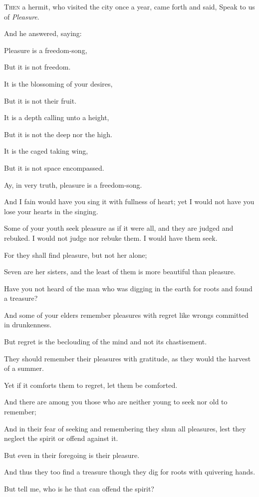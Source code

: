 
\lettrine{T}{hen} a hermit, who visited the city
once a year, came forth and said, Speak
to us of \textit{Pleasure}.

And he answered, saying:

Pleasure is a freedom-song,

But it is not freedom.

It is the blossoming of your desires,

But it is not their fruit.

It is a depth calling unto a height,

But it is not the deep nor the high.

It is the caged taking wing,

But it is not space encompassed.

Ay, in very truth, pleasure is a
freedom-song.

And I fain would have you sing it with
fullness of heart; yet I would not have
you lose your hearts in the singing.

Some of your youth seek pleasure as if
it were all, and they are judged and
rebuked. I would not judge nor
rebuke them. I would have them seek.

For they shall find pleasure, but not
her alone;

Seven are her sisters, and the least of
them is more beautiful than pleasure.

Have you not heard of the man who was
digging in the earth for roots and found
a treasure?



And some of your elders remember
pleasures with regret like wrongs
committed in drunkenness.

But regret is the beclouding of the mind
and not its chastisement.

They should remember their pleasures
with gratitude, as they would the
harvest of a summer.

Yet if it comforts them to regret, let
them be comforted.

And there are among you those who
are neither young to seek nor old to
remember;

And in their fear of seeking and
remembering they shun all pleasures,
lest they neglect the spirit or offend
against it.

But even in their foregoing is their
pleasure.

And thus they too find a treasure though
they dig for roots with quivering hands.

But tell me, who is he that can offend
the spirit?

